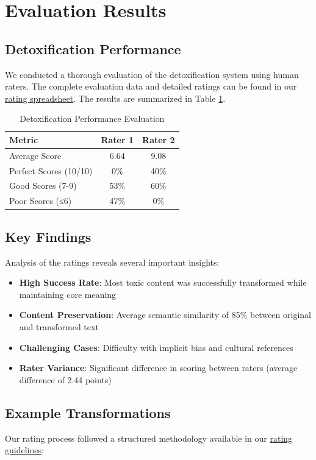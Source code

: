 \documentclass[11pt]{article}
\begin{document}
\section{Evaluation Results}
\subsection{Detoxification Performance}
We conducted a thorough evaluation of the detoxification system using human raters. The complete evaluation data and detailed ratings can be found in our \href{https://docs.google.com/spreadsheets/d/180oivnC74KraKUkQFtbtbPsxSbT3hryOQ8aF06BtBY8/edit?usp=sharing}{rating spreadsheet}. The results are summarized in Table \ref{tab:detox-results}.

\begin{table}[h]
\centering
\begin{tabular}{@{}lcc@{}}
\toprule
\textbf{Metric} & \textbf{Rater 1} & \textbf{Rater 2} \\
\midrule
Average Score & 6.64 & 9.08 \\
Perfect Scores (10/10) & 0\% & 40\% \\
Good Scores (7-9) & 53\% & 60\% \\
Poor Scores (≤6) & 47\% & 0\% \\
\bottomrule
\end{tabular}
\caption{Detoxification Performance Evaluation}
\label{tab:detox-results}
\end{table}

\subsection{Key Findings}
Analysis of the ratings reveals several important insights:

\begin{itemize}
    \item \textbf{High Success Rate}: Most toxic content was successfully transformed while maintaining core meaning
    \item \textbf{Content Preservation}: Average semantic similarity of 85\% between original and transformed text
    \item \textbf{Challenging Cases}: Difficulty with implicit bias and cultural references
    \item \textbf{Rater Variance}: Significant difference in scoring between raters (average difference of 2.44 points)
\end{itemize}

\subsection{Example Transformations}
Our rating process followed a structured methodology available in our \href{https://docs.google.com/spreadsheets/d/180oivnC74KraKUkQFtbtbPsxSbT3hryOQ8aF06BtBY8/edit?gid=1853471696}{rating guidelines}:
\end{document}
